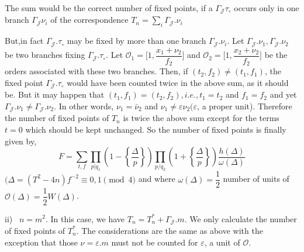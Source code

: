 The sum would be the correct number of fixed points, if a
$\Gamma_\mathcal{J} \tau_\circ$ occurs only in one branch
$\Gamma_\mathcal{J} \nu_i$ of the correspondence $T_n = \sum
\limits_i \Gamma_\mathcal{J}. \nu_i$ 

But,\pageoriginale in fact $\Gamma_\mathcal{J}. \tau_\circ$ may be fixed by more
than one branch $\Gamma_\mathcal{J}.  \nu_i$. Let
$\Gamma_\mathcal{J}. \nu_1, \Gamma_\mathcal{J}. \nu_2$ be two branches
fixing $\Gamma_\mathcal{J}. \tau_\circ$. Let $\mathscr{O}_1= \bigg [
  1, \dfrac{x_1 + \nu_2}{f_2}\bigg]$ and $\mathscr{O}_2= \bigg [1,
  \dfrac{x_2 + \nu_2}{f_2}\bigg]$ be the orders associated with these
two branches. Then, if $(t_2, f_2) \neq (t_1, f_1)$, the fixed point
$\Gamma_\mathcal{J}. \tau_\circ$ would have been counted twice in the
above sum, as it should be. But it may happen that $(t_1, f_1) = (t_2,
f_2), i.e., t_1 =t_2$ and $f_1 = f_2$ and yet
$\Gamma_\mathcal{J}. \nu_1 \neq \Gamma_\mathcal{J}. \nu_2$. In other
words, $\nu_1 = \bar{\nu}_2$ and $\nu_1 \neq \varepsilon \nu_2 (
\varepsilon$, a proper unit). Therefore the number of fixed points of
$T_n$ is twice the above sum except for the terms $t = 0$ which should
be kept unchanged. So the number of fixed points is finally given by, 
\begin{equation}
  F = \sum_{t, f} \prod_{p|q_1} \left(1- \left \{ \frac{\Delta}{p}\right\}\right)
  \prod _{p/q_2} \left(1+ \left\{\frac{\Delta}{p}\right \}\right)
  \frac{h(\Delta)}{\omega (\Delta)} \tag{*} 
\end{equation}
$(\Delta = (T^2 -4n)f^{-2} \equiv 0, 1 \pmod 4$ and where $\omega
(\Delta)= \dfrac{1}{2}$ number of units of $\mathscr{O}(\Delta) =
\dfrac{1}{2}W (\Delta)$. 

ii)~ $n=m^2$. In this case, we have $T_n = T^*_n + \Gamma_\mathcal{J}.
m$. We only calculate the number of fixed points of $T^*_n$. The
considerations are the same as above with the exception that those
$\nu = \varepsilon. m$ must not be counted for $\varepsilon$, a unit
of $\mathscr{O}$. 

